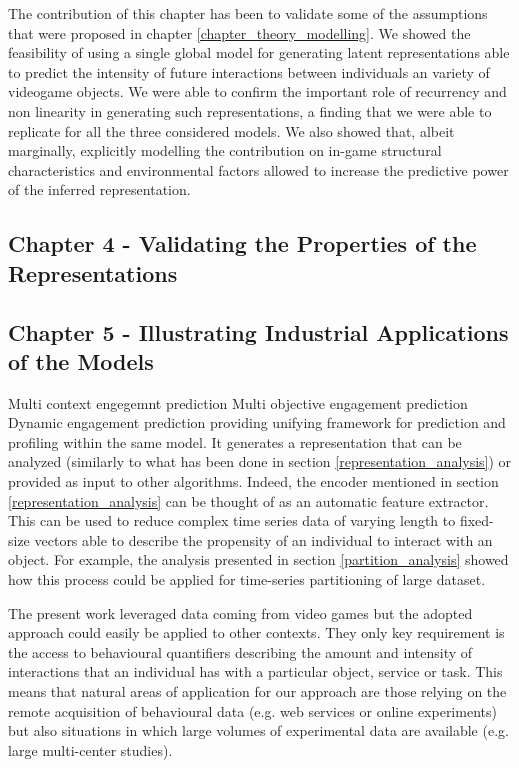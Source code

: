 The contribution of this chapter has been to validate some of the assumptions that were proposed in chapter \ref{chapter_theory_modelling}. 
We showed the feasibility of using a single global model for generating latent representations able to predict the intensity of future interactions between individuals an variety of videogame objects.
We were able to confirm the important role of recurrency and non linearity in generating such representations, a finding that we were able to replicate for all the three considered models. We also showed that, albeit marginally, explicitly modelling the contribution on in-game structural characteristics and environmental factors allowed to increase the predictive power of the inferred representation.

\subsection{Chapter 4 - Validating the Properties of the Representations}
\label{discussion_chapter_four}


\subsection{Chapter 5 - Illustrating Industrial Applications of the Models}
\label{discussion_chapter_five}

Multi context engegemnt prediction
Multi objective engagement prediction
Dynamic engagement prediction
providing unifying framework for prediction and profiling within the same model.
It generates a representation that can be analyzed (similarly to what has been done in section \ref{representation_analysis}) or provided as input to other algorithms. Indeed, the encoder mentioned in section \ref{representation_analysis} can be thought of as an automatic feature extractor. This can be used to reduce complex time series data of varying length to fixed-size vectors able to describe the propensity of an individual to interact with an object. For example, the analysis presented in section \ref{partition_analysis} showed how this process could be applied for time-series partitioning of large dataset.

The present work leveraged data coming from video games but the adopted approach could easily be applied to other contexts. They only key requirement is the access to behavioural quantifiers describing the amount and intensity of interactions that an individual has with a particular object, service or task. This means that natural areas of application for our approach are those relying on the remote acquisition of behavioural data (e.g. web services or online experiments) but also situations in which large volumes of experimental data are available (e.g. large multi-center studies). 

